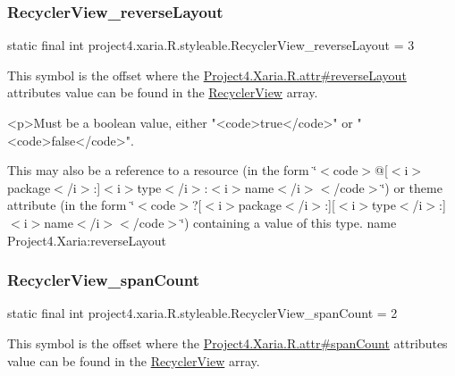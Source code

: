 \subsubsection{\texorpdfstring{Recycler\+View\+\_\+reverse\+Layout}{RecyclerView\_reverseLayout}}
{\footnotesize\ttfamily static final int project4.\+xaria.\+R.\+styleable.\+Recycler\+View\+\_\+reverse\+Layout = 3\hspace{0.3cm}{\ttfamily [static]}}

This symbol is the offset where the \hyperlink{}{Project4.\+Xaria.\+R.\+attr\#reverse\+Layout} attribute\textquotesingle{}s value can be found in the \hyperlink{classproject4_1_1xaria_1_1R_1_1styleable_ad70c99b52204a6206f85345454bda20d}{Recycler\+View} array.

\begin{DoxyVerb}      <p>Must be a boolean value, either "<code>true</code>" or "<code>false</code>".
\end{DoxyVerb}
 

This may also be a reference to a resource (in the form \char`\"{}$<$code$>$@\mbox{[}$<$i$>$package$<$/i$>$\+:\mbox{]}$<$i$>$type$<$/i$>$\+:$<$i$>$name$<$/i$>$$<$/code$>$\char`\"{}) or theme attribute (in the form \char`\"{}$<$code$>$?\mbox{[}$<$i$>$package$<$/i$>$\+:\mbox{]}\mbox{[}$<$i$>$type$<$/i$>$\+:\mbox{]}$<$i$>$name$<$/i$>$$<$/code$>$\char`\"{}) containing a value of this type.  name Project4.\+Xaria\+:reverse\+Layout \mbox{\label{classproject4_1_1xaria_1_1R_1_1styleable_a7ecd16415effb7a235b31c1193ed8b2f}} 
\subsubsection{\texorpdfstring{Recycler\+View\+\_\+span\+Count}{RecyclerView\_spanCount}}
{\footnotesize\ttfamily static final int project4.\+xaria.\+R.\+styleable.\+Recycler\+View\+\_\+span\+Count = 2\hspace{0.3cm}{\ttfamily [static]}}

This symbol is the offset where the \hyperlink{}{Project4.\+Xaria.\+R.\+attr\#span\+Count} attribute\textquotesingle{}s value can be found in the \hyperlink{classproject4_1_1xaria_1_1R_1_1styleable_ad70c99b52204a6206f85345454bda20d}{Recycler\+View} array.

